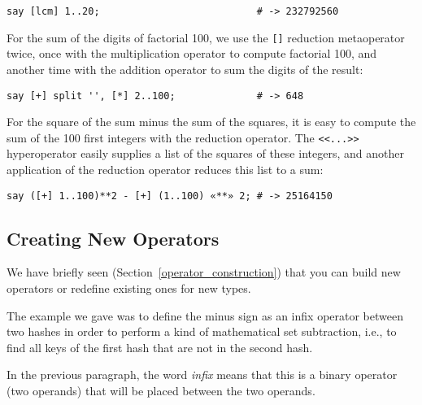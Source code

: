 \begin{verbatim}
say [lcm] 1..20;                           # -> 232792560
\end{verbatim}

For the sum of the digits of factorial 100, we use 
the \verb'[]' reduction metaoperator twice, once with 
the multiplication operator to compute factorial 100, 
and another time with the addition operator to sum 
the digits of the result:

\begin{verbatim}
say [+] split '', [*] 2..100;              # -> 648
\end{verbatim}

For the square of the sum minus the sum of the squares, 
it is easy to compute the sum of the 100 first integers 
with the reduction operator. The \verb'<<...>>' 
hyperoperator easily supplies a list of the squares of 
these integers, and another application of the reduction 
operator reduces this list to a sum:

\begin{verbatim}
say ([+] 1..100)**2 - [+] (1..100) «**» 2; # -> 25164150
\end{verbatim}

\subsection{Creating New Operators}

We have briefly seen (Section~\ref{operator_construction}) 
that you can build new operators or redefine existing ones 
for new types.

The example we gave was to define the minus sign 
as an infix operator between two hashes in order to 
perform a kind of mathematical set subtraction, i.e., 
to find all keys of the first hash that are not in the 
second hash.

In the previous paragraph, the word \emph{infix} means 
that this is a binary operator (two operands) that will 
be placed between the two operands. 

